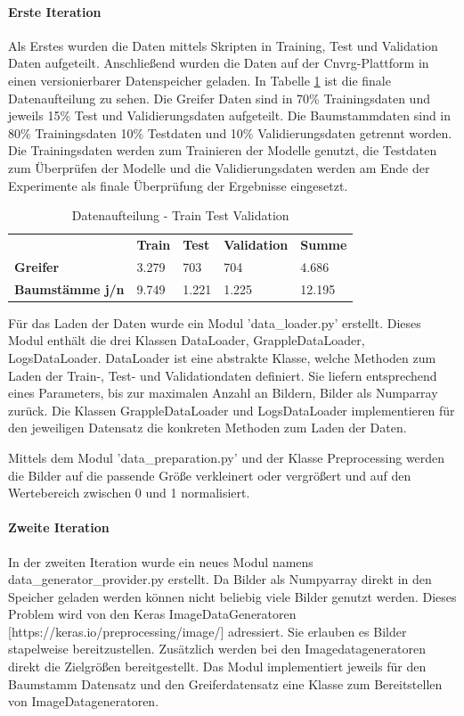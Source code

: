 	\paragraph{Erste Iteration} Als Erstes wurden die Daten mittels Skripten in Training, Test und Validation Daten aufgeteilt. Anschließend wurden die Daten auf der Cnvrg-Plattform in einen versionierbarer Datenspeicher geladen. In Tabelle \ref{table:DatenaufteilungTrainTestValidation} ist die finale Datenaufteilung zu sehen. Die Greifer Daten sind in 70\% Trainingsdaten und jeweils 15\% Test und Validierungsdaten aufgeteilt. Die Baumstammdaten sind in 80\% Trainingsdaten 10\% Testdaten und 10\% Validierungsdaten getrennt worden. Die Trainingsdaten werden zum Trainieren der Modelle genutzt, die Testdaten zum Überprüfen der Modelle und die Validierungsdaten werden am Ende der Experimente als finale Überprüfung der Ergebnisse eingesetzt.
	\begin{table}[ht]
		\centering
		\begin{tabularx}{\textwidth}{lllll}
			& \textbf{Train} & \textbf{Test}  & \textbf{Validation} & \textbf{Summe} 	 \\
			\textbf{Greifer} 				 & 	3.279			& 703	 & 704				   & 4.686 	\\
			\textbf{Baumstämme j/n}	 	  &  9.749	   & 1.221 	& 1.225	& 12.195\\		
		\end{tabularx}
		\caption{Datenaufteilung - Train Test Validation}
		\label{table:DatenaufteilungTrainTestValidation}
	\end{table}
	
	Für das Laden der Daten wurde ein Modul 'data\_loader.py' erstellt. Dieses Modul enthält die drei Klassen DataLoader, GrappleDataLoader, LogsDataLoader. DataLoader ist eine abstrakte Klasse, welche Methoden zum Laden der Train-, Test- und Validationdaten definiert. Sie liefern entsprechend eines Parameters, bis zur maximalen Anzahl an Bildern, Bilder als Numparray zurück. Die Klassen GrappleDataLoader und LogsDataLoader implementieren für den jeweiligen Datensatz die konkreten Methoden zum Laden der Daten.
	
	Mittels dem Modul 'data\_preparation.py' und der Klasse Preprocessing werden die Bilder auf die passende Größe verkleinert oder vergrößert und auf den Wertebereich zwischen 0 und 1 normalisiert.
	
	\paragraph{Zweite Iteration} 
	In der zweiten Iteration wurde ein neues Modul namens data\_generator\_provider.py erstellt. Da Bilder als Numpyarray direkt in den Speicher geladen werden können nicht beliebig viele Bilder genutzt werden. Dieses Problem wird von den Keras ImageDataGeneratoren [https://keras.io/preprocessing/image/] adressiert. Sie erlauben es Bilder stapelweise bereitzustellen. Zusätzlich werden bei den Imagedatageneratoren direkt die Zielgrößen bereitgestellt. Das Modul implementiert jeweils für den Baumstamm Datensatz und den Greiferdatensatz eine Klasse zum Bereitstellen von ImageDatageneratoren.
	
